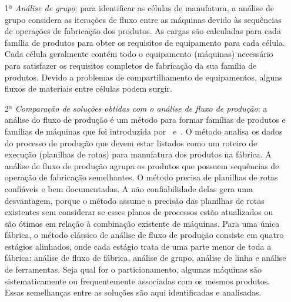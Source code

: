 \begin{enumerate}
\item[1ª] \textit{Análise de grupo}: para identificar as células de manufatura, a análise de grupo considera as iterações de fluxo entre as máquinas devido às sequências de operações de fabricação dos produtos. As cargas são calculadas para cada família de produtos para obter os requisitos de equipamento para cada célula. Cada célula geralmente contém todo o equipamento (máquinas) necessário para satisfazer os requisitos completos de fabricação da sua família de produtos. Devido a problemas de compartilhamento de equipamentos, alguns fluxos de materiais entre células podem surgir.  
    
\item[2ª] \textit{Comparação de soluções obtidas com o análise de fluxo de produção}: a análise do fluxo de produção é um método para formar famílias de produtos e famílias de máquinas que foi introduzida por~\cite{burbidge1961new} e~\cite{burbridge1963production}. O método analisa os dados do processo de produção que devem estar listados como um roteiro de execução (planilhas de rotas) para manufatura dos produtos na fábrica. A análise de fluxo de produção agrupa os produtos que possuem sequências de operação de fabricação semelhantes. O método precisa de planilhas de rotas confiáveis e bem documentadas. A não confiabilidade delas gera uma desvantagem, porque o método assume a precisão das planilhas de rotas existentes sem considerar se esses planos de processos estão atualizados ou são ótimos em relação à combinação existente de máquinas. Para uma única fábrica, o método clássico de análise de fluxo de produção consiste em quatro estágios alinhados, onde cada estágio trata de uma parte menor de toda a fábrica: análise de fluxo de fábrica, análise de grupo, análise de linha e análise de ferramentas. Seja qual for o particionamento, algumas máquinas são sistematicamente ou frequentemente associadas com os mesmos produtos. Essas semelhanças entre as soluções são aqui identificadas e analisadas. 


\end{enumerate}

